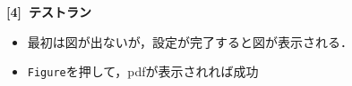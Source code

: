 \documentclass{ujarticle}
\begin{document}
\begin{enumerate}[\bf\large 1.]
\begin{enumerate}[(1)]
\vspace{77mm}

{\bf [4]\ テストラン}

\begin{itemize}
 \item 最初は図が出ないが，設定が完了すると図が表示される．
\item\verb|Figure|を押して，pdfが表示されれば成功
\end{itemize}

  \end{enumerate}

\end{enumerate}
\end{document}
